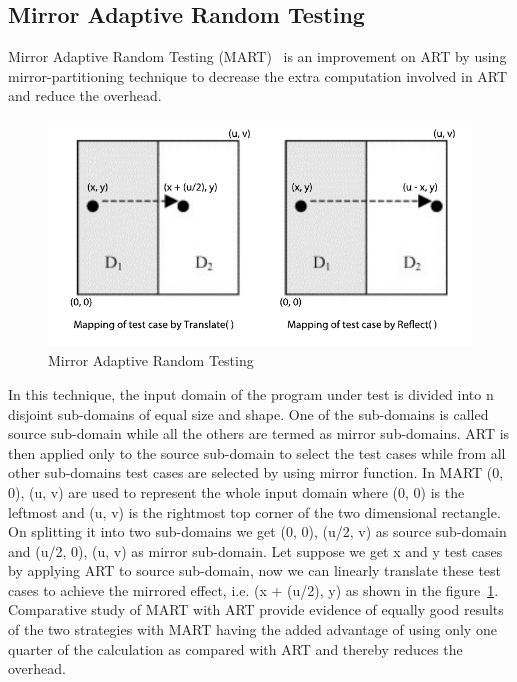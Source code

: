 {\subsection{Mirror Adaptive Random Testing}
Mirror Adaptive Random Testing (MART)~\cite{Chen2003} is an improvement on ART by using mirror-partitioning technique to decrease the extra computation involved in ART and reduce the overhead.

\begin{figure}[h]
\begin{center}
	\includegraphics[width=13cm, height=6cm ]{Literature/mart2.pdf}
	\caption{Mirror Adaptive Random Testing~\cite{Chen2003}}
\label{fig:mirrorART}
\end{center}  
\end{figure}

In this technique, the input domain of the program under test is divided into n disjoint sub-domains of equal size and shape. One of the sub-domains is called source sub-domain while all the others are termed as mirror sub-domains. ART is then applied only to the source sub-domain to select the test cases while from all other sub-domains test cases are selected by using mirror function. In MART {(0, 0), (u, v)} are used to represent the whole input domain where (0, 0) is the leftmost and (u, v) is the rightmost top corner of the two dimensional rectangle. On splitting it into two sub-domains we get {(0, 0), (u/2, v)} as source sub-domain and {(u/2, 0), (u, v)} as mirror sub-domain. Let suppose we get x and y test cases by applying ART to source sub-domain, now we can linearly translate these test cases to achieve the mirrored effect, i.e. (x + (u/2), y) as shown in the figure~\ref{fig:mirrorART}. Comparative study of MART with ART provide evidence of equally good results of the two strategies with MART having the added advantage of using only one quarter of the calculation as compared with ART and thereby reduces the overhead.


}
